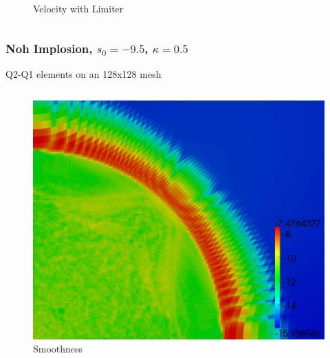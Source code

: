 \documentclass[8pt,xcolor=svgnames]{beamer}
\begin{document}
\begin{frame}
\begin{columns}
\begin{column}{0.3\textwidth}
\begin{figure}[t]
\begin{center}
\\Velocity with Limiter
\end{center}
\end{figure}
\end{column}
\end{columns}
\end{frame}


\begin{frame}\frametitle{Noh Implosion, $s_0=-9.5$, $\kappa=0.5$}
\vspace{1ex}
Q2-Q1 elements on an 128x128 mesh
\vspace{-4ex}
\begin{columns}
\begin{column}{0.3\textwidth}
\begin{figure}[t]
\begin{center}
\includegraphics[height=0.9\textwidth]{figs/Noh/Q2l-7-smoothness.png}
\\Smoothness
\end{center}
\end{figure}
\begin{figure}[t]
\begin{center}

\end{center}
\end{figure}
\end{column}
\end{columns}
\end{frame}
\end{document}
